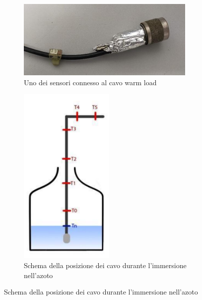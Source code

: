 \begin{figure}[H]
\centering

	\begin{subfigure}{0.49\textwidth}
		\includegraphics[width=\textwidth]{Posizione_sensori_1.png}
    		\caption{Uno dei sensori connesso al cavo warm load}
   	 	\label{fig:sub1}
	\end{subfigure}
	\hfill
	\begin{subfigure}{0.49\textwidth}
		\centering
    		\includegraphics[width=0.5\textwidth]{Posizione_sensori_3.png}
    		\caption{Schema della posizione dei cavo durante l'immersione nell'azoto}
    		\label{fig:sub2}
	\end{subfigure}


\end{figure}
